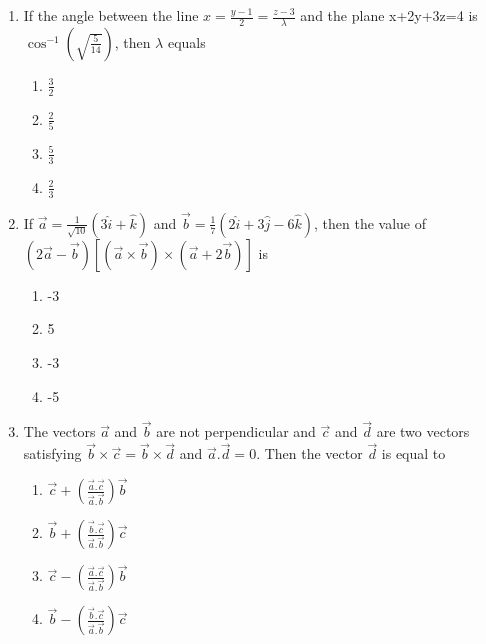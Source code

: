 \begin{enumerate}[label=\arabic*.,ref=\thesubsection.\theenumi]
\item If the angle between the line $x=\frac{y-1}{2}=\frac{z-3}{\lambda}$ and the plane x+2y+3z=4 is $\cos^{-1}(\sqrt{\frac{5}{14}})$, then $\lambda$ equals
\begin{enumerate}
\item $\frac{3}{2}$
\item $\frac{2}{5}$
\item $\frac{5}{3}$
\item $\frac{2}{3}$
\end{enumerate}

\item If $\overrightarrow{a}=\frac{1}{\sqrt{10}}(3\hat{i}+\hat{k})$ and $\overrightarrow{b}=\frac{1}{7}(2\hat{i}+3\hat{j}-6\hat{k})$, then the value of $(2\overrightarrow{a}-\overrightarrow{b})[(\overrightarrow{a} \times \overrightarrow{b}) \times (\overrightarrow{a}+2\overrightarrow{b})]$ is
\begin{enumerate}
\item -3
\item 5
\item -3
\item -5
\end{enumerate}

\item The vectors $\overrightarrow{a}$ and $\overrightarrow{b}$ are not perpendicular and $\overrightarrow{c}$  and $\overrightarrow{d}$ are two vectors satisfying $\overrightarrow{b} \times \overrightarrow{c}=\overrightarrow{b} \times \overrightarrow{d}$ and $\overrightarrow{a}.\overrightarrow{d}=0$. Then the vector $\overrightarrow{d}$ is equal to
\begin{enumerate}
\item $\overrightarrow{c}+(\frac{\overrightarrow{a}.\overrightarrow{c}}{\overrightarrow{a}.\overrightarrow{b}})\overrightarrow{b}$
\item $\overrightarrow{b}+(\frac{\overrightarrow{b}.\overrightarrow{c}}{\overrightarrow{a}.\overrightarrow{b}})\overrightarrow{c}$
\item $\overrightarrow{c}-(\frac{\overrightarrow{a}.\overrightarrow{c}}{\overrightarrow{a}.\overrightarrow{b}})\overrightarrow{b}$
\item $\overrightarrow{b}-(\frac{\overrightarrow{b}.\overrightarrow{c}}{\overrightarrow{a}.\overrightarrow{b}})\overrightarrow{c}$
\end{enumerate}


\end{enumerate}
